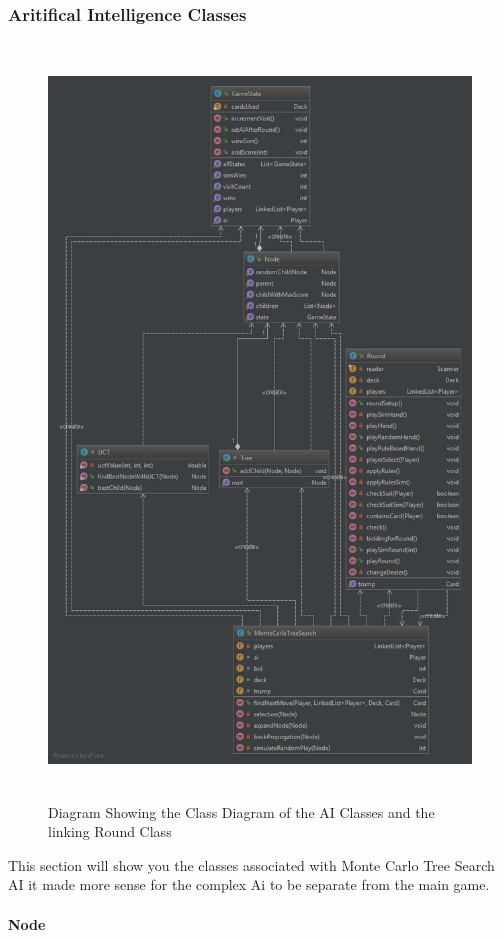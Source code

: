 \subsubsection{Aritifical Intelligence Classes}
\begin{figure}[h]
\centering
\label{fig:AI_Classes}
\includegraphics[width=15cm ,height=20cm,keepaspectratio]{AI_Classes}
\caption{Diagram Showing the Class Diagram of the AI Classes and the linking Round Class}
\end{figure}
This section will show you the classes associated with Monte Carlo Tree Search AI it made more sense for the complex Ai to be separate from the main game.
\paragraph{Node}

